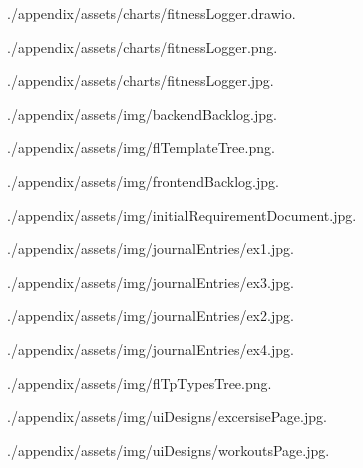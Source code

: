\item ./appendix/assets/charts/fitnessLogger.drawio.  
\item ./appendix/assets/charts/fitnessLogger.png.  
\item ./appendix/assets/charts/fitnessLogger.jpg.  
\item ./appendix/assets/img/backendBacklog.jpg.  
\item ./appendix/assets/img/flTemplateTree.png.  
\item ./appendix/assets/img/frontendBacklog.jpg.  
\item ./appendix/assets/img/initialRequirementDocument.jpg.  
\item ./appendix/assets/img/journalEntries/ex1.jpg.  
\item ./appendix/assets/img/journalEntries/ex3.jpg.  
\item ./appendix/assets/img/journalEntries/ex2.jpg.  
\item ./appendix/assets/img/journalEntries/ex4.jpg.  
\item ./appendix/assets/img/flTpTypesTree.png.  
\item ./appendix/assets/img/uiDesigns/excersisePage.jpg.  
\item ./appendix/assets/img/uiDesigns/workoutsPage.jpg.  
